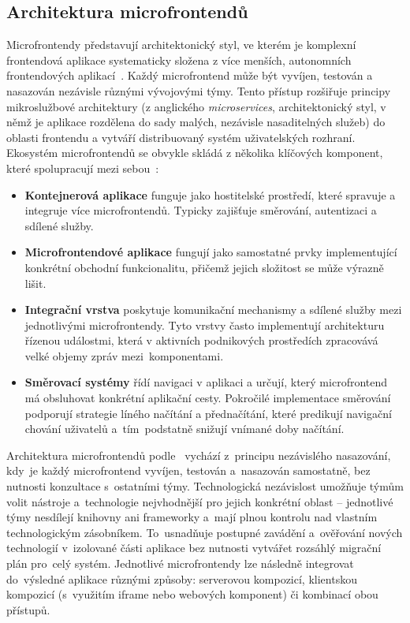 \subsection{Architektura microfrontendů}
\label{MikroFrontendy}
Microfrontendy představují architektonický styl, ve kterém je komplexní frontendová aplikace systematicky složena z více menších, autonomních frontendových aplikací~\cite{MicroFrontends}. Každý microfrontend může být vyvíjen, testován a nasazován nezávisle různými vývojovými týmy. Tento přístup rozšiřuje principy mikroslužbové architektury (z anglického \textit{microservices}, architektonický styl, v němž je aplikace rozdělena do sady malých, nezávisle nasaditelných služeb) do oblasti frontendu a vytváří distribuovaný systém uživatelských rozhraní. Ekosystém microfrontendů se obvykle skládá z několika klíčových komponent, které spolupracují mezi sebou~\cite{MicroFrontends}:

\begin{itemize}
    \item \textbf{Kontejnerová aplikace} funguje jako hostitelské prostředí, které spravuje a integruje více microfrontendů. Typicky zajišťuje směrování, autentizaci a sdílené služby.
    \item \textbf{Microfrontendové aplikace} fungují jako samostatné prvky implementující konkrétní obchodní funkcionalitu, přičemž jejich složitost se může výrazně lišit.
    \item \textbf{Integrační vrstva} poskytuje komunikační mechanismy a sdílené služby mezi jednotlivými microfrontendy. Tyto vrstvy často implementují architekturu řízenou událostmi, která v aktivních podnikových prostředích zpracovává velké objemy zpráv mezi~komponentami.
    \item \textbf{Směrovací systémy} řídí navigaci v aplikaci a určují, který microfrontend má obsluhovat konkrétní aplikační cesty. Pokročilé implementace směrování podporují strategie líného načítání a přednačítání, které predikují navigační chování uživatelů a~tím~podstatně snižují vnímané doby načítání.
\end{itemize}

 Architektura microfrontendů podle~\cite{MicrofrontensGeers} vychází
z~principu nezávislého nasazování, kdy~je každý microfrontend vyvíjen,
testován a~nasazován samostatně, bez nutnosti konzultace s~ostatními
týmy. Technologická nezávislost umožňuje týmům volit nástroje
a~technologie nejvhodnější pro jejich konkrétní oblast -- jednotlivé
týmy nesdílejí knihovny ani frameworky a~mají plnou kontrolu nad
vlastním technologickým zásobníkem. To~usnadňuje postupné zavádění
a~ověřování nových technologií v~izolované části aplikace bez nutnosti
vytvářet rozsáhlý migrační plán pro~celý systém. Jednotlivé microfrontendy lze následně integrovat do~výsledné aplikace
různými způsoby: serverovou kompozicí, klientskou kompozicí (s~využitím
iframe nebo webových komponent) či kombinací obou přístupů.

